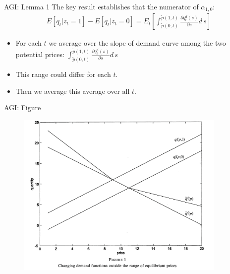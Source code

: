 \documentclass[xcolor=pdftex,dvipsnames,table,mathserif]{beamer}
\begin{document}
\begin{frame}{AGI: Lemma 1}
The key result establishes that the numerator of $\alpha_{1,0}$:
\begin{eqnarray*}
E[q_t | z_t =1] - E[q_t | z_t = 0] = E_t \left[\int_{\tilde{p}(0,t)}^{\tilde{p}(1,t)} \frac{\partial q_t^d(s)}{\partial s}{d\, s} \right]
\end{eqnarray*}
\begin{itemize}
\item For each $t$ we average over the slope of demand curve among the two potential prices: $\int_{\tilde{p}(0,t)}^{\tilde{p}(1,t)} \frac{\partial q_t^d(s)}{\partial s}{d\, s}$ 
\item This range could differ for each $t$.
\item Then we average this average over all $t$.
\end{itemize}
\end{frame}

\begin{frame}{AGI: Figure}
\begin{figure}
\begin{center}
\includegraphics[width=4in]{resources/fishfigure.png}
\end{center}
\end{figure}
\end{frame}
\end{document}
